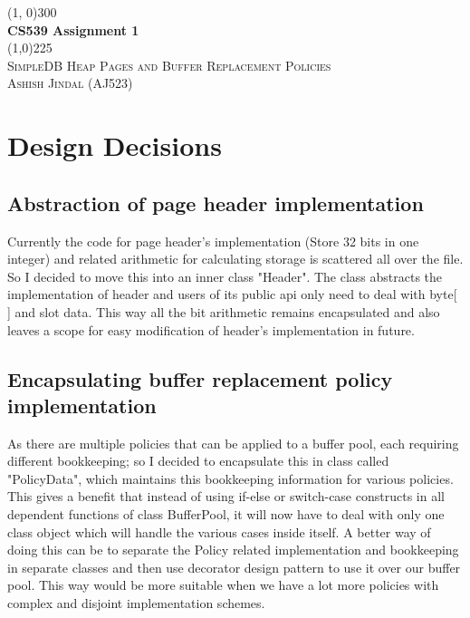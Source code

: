 \documentclass{article}
\begin{document}
\begin{titlepage}
\begin{center}

\line(1, 0){300}\\
[4mm]
\huge{\bfseries CS539 Assignment 1}\\
\line(1,0){225}\\
[4mm]
\textsc{\Large SimpleDB Heap Pages and Buffer Replacement Policies}\\
\textsc{\large Ashish Jindal (AJ523)}

\end{center}	

\section{Design Decisions}
\subsection{Abstraction of page header implementation}
Currently the code for page header's implementation (Store 32 bits in one integer) and related arithmetic for calculating storage is scattered all over the file. So I decided to move this into an inner class "Header". The class abstracts the implementation of header and users of its public api only need to deal with byte[ ] and slot data. This way all the bit arithmetic remains encapsulated and also leaves a scope for easy modification of header's implementation in future.

\subsection{Encapsulating buffer replacement policy implementation}
As there are multiple policies that can be applied to a buffer pool, each requiring different bookkeeping; so I decided to encapsulate this in class called "PolicyData", which maintains this bookkeeping information for various policies. This gives a benefit that instead of using if-else or switch-case constructs in all dependent functions of class BufferPool, it will now have to deal with only one class object which will handle the various cases inside itself. A better way of doing this can be to separate the Policy related implementation and bookkeeping in separate classes and then use decorator design pattern to use it over our buffer pool. This way would be more suitable when we have a lot more policies with complex and disjoint implementation schemes.


\end{titlepage}
\end{document}
